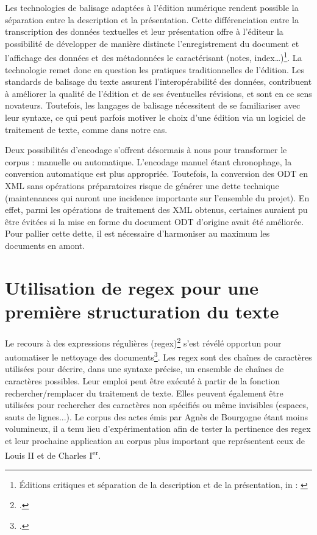 \par Les technologies de balisage adaptées à l’édition numérique rendent possible la séparation entre la description et la présentation. Cette différenciation entre la transcription des données textuelles et leur présentation offre à l'éditeur la possibilité de développer de manière distincte l’enregistrement du document et l’affichage des données et des métadonnées le caractérisant (notes, index…)\footnote{\og Éditions critiques et séparation de la description et de la présentation, in : \cite{apollonEditionCritiqueEre2017}}. La technologie remet donc en question les pratiques traditionnelles de l'édition. Les standards de balisage du texte assurent l’interopérabilité des données, contribuent à améliorer la qualité de l'édition et de ses éventuelles révisions, et sont en ce sens novateurs. Toutefois, les langages de balisage nécessitent de se familiariser avec leur syntaxe, ce qui peut parfois motiver le choix d’une édition via un logiciel de traitement de texte, comme dans notre cas. 
\newline 

\par Deux possibilités d'encodage s'offrent désormais à nous pour transformer le corpus : manuelle ou automatique. L'encodage manuel étant chronophage, la conversion automatique est plus appropriée. Toutefois, la conversion des ODT en XML sans opérations préparatoires risque de générer une \og dette technique \fg \space (maintenances qui auront une incidence importante sur l'ensemble du projet). En effet, parmi les opérations de traitement des XML obtenus, certaines auraient pu être évitées si la mise en forme du document ODT d'origine avait été améliorée. Pour pallier cette \og dette\fg, il est nécessaire d'harmoniser au maximum les documents en amont.

\newpage 

\section[Utilisation de regex]{Utilisation de regex pour une première structuration du texte}
\label{II.3.2}

\par Le recours à des expressions régulières (regex)\footnote{\cite{ListRegularExpressions}.} s’est révélé opportun pour automatiser le nettoyage des documents\footnote{\cite{UsingRegularExpressions}.}. Les regex sont des chaînes de caractères utilisées pour décrire, dans une syntaxe précise, un ensemble de chaînes de caractères possibles. Leur emploi peut être exécuté à partir de la fonction rechercher/remplacer du traitement de texte. Elles peuvent également être utilisées pour rechercher des caractères non spécifiés ou même invisibles (espaces, sauts de lignes...). Le corpus des actes émis par Agnès de Bourgogne étant moins volumineux, il a tenu lieu d’expérimentation afin de tester la pertinence des regex et leur prochaine application au corpus plus important que représentent ceux de Louis II et de Charles I\textsuperscript{er}. 
\newline 

